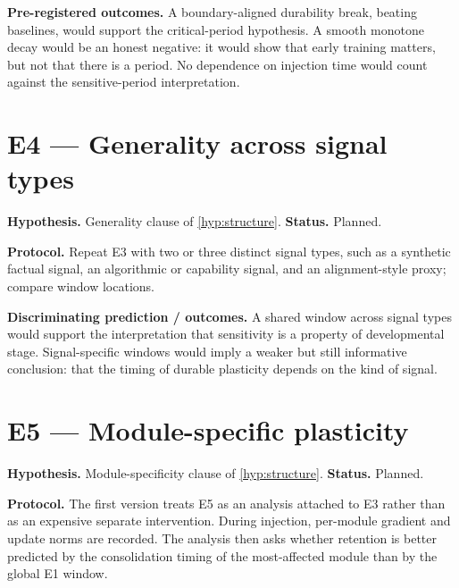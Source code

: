 \noindent\textbf{Pre-registered outcomes.} A boundary-aligned durability break, beating baselines,
would support the critical-period hypothesis. A smooth monotone decay would be an honest negative:
it would show that early training matters, but not that there is a period. No dependence on
injection time would count against the sensitive-period interpretation.


\section{E4 --- Generality across signal types}
\label{sec:res-e4}

\noindent\textbf{Hypothesis.} Generality clause of \cref{hyp:structure}. \quad\textbf{Status.}
Planned.

\noindent\textbf{Protocol.} Repeat E3 with two or three distinct signal types, such as a synthetic
factual signal, an algorithmic or capability signal, and an alignment-style proxy; compare window
locations.

\noindent\textbf{Discriminating prediction / outcomes.} A shared window across signal types would
support the interpretation that sensitivity is a property of developmental stage. Signal-specific
windows would imply a weaker but still informative conclusion: that the timing of durable
plasticity depends on the kind of signal.


\section{E5 --- Module-specific plasticity}
\label{sec:res-e5}

\noindent\textbf{Hypothesis.} Module-specificity clause of \cref{hyp:structure}.
\quad\textbf{Status.} Planned.

\noindent\textbf{Protocol.} The first version treats E5 as an analysis attached to E3 rather than as
an expensive separate intervention. During injection, per-module gradient and update norms are
recorded. The analysis then asks whether retention is better predicted by the consolidation timing
of the most-affected module than by the global E1 window.

